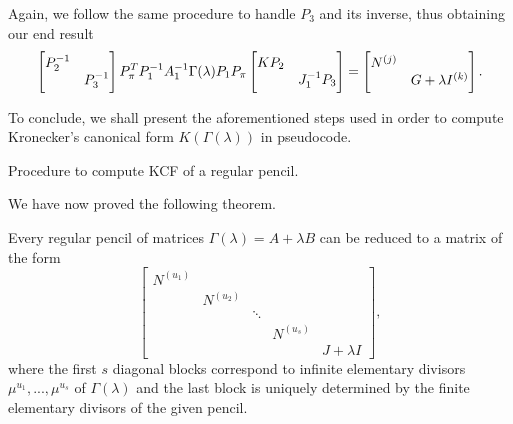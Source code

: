 Again, we follow the same procedure to handle \(P_{3}\) and its inverse, thus obtaining our end result
\begin{gather}
    \scalemath{0.975}{
        \begin{bmatrix}
            P_{2}^{-1} & \\
            & P_{3}^{-1}
        \end{bmatrix}
        P_{\pi}^T P_{1}^{-1} A_{1}^{-1} \Gamma(\lambda) P_{1} P_{\pi}
        \begin{bmatrix}
            KP_{2} & \\
            & J_{1}^{-1}P_{3}
        \end{bmatrix} =
        \begin{bmatrix}
            N^{(j)} & \\
            & G + \lambda I^{(k)}
        \end{bmatrix}. \label{gamma-reg}
    }
\end{gather}

To conclude, we shall present the aforementioned steps used in order to compute Kronecker's canonical form
\(K(\Gamma(\lambda))\) in pseudocode.
\begin{algorithm}
    \caption{Procedure to compute KCF of a regular pencil.}\label{alg:kcf-regular}
\end{algorithm}

We have now proved the following theorem.
\begin{theorem}
    Every regular pencil of matrices \(\Gamma(\lambda) = A + \lambda B\) can be reduced to a matrix of the form
    \[
        \begin{bmatrix}
            N^{(u_{1})} \\
            & N^{(u_{2})} \\
            & & \ddots \\
            & & & N^{(u_{s})} \\
            & & & & J + \lambda I
        \end{bmatrix},
    \]
    where the first \(s\) diagonal blocks correspond to infinite elementary divisors
    \(\mu^{u_{1}}, ..., \mu^{u_{s}}\) of \(\Gamma(\lambda)\) and the last block is uniquely determined by the
    finite elementary divisors of the given pencil.
\end{theorem}

